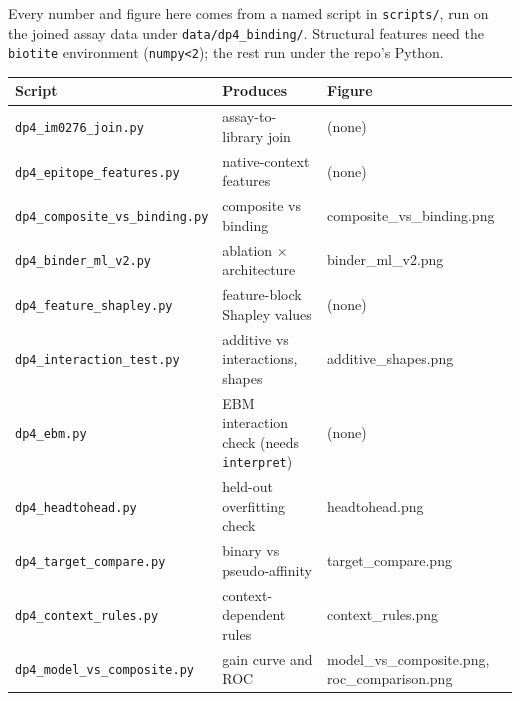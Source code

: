 \documentclass[11pt]{article}
\begin{document}
Every number and figure here comes from a named script in \texttt{scripts/}, run on the joined assay
data under \texttt{data/dp4\_binding/}. Structural features need the \texttt{biotite} environment
(\texttt{numpy<2}); the rest run under the repo's Python.

\footnotesize
\begin{tabular}{@{}lll@{}}
\toprule
Script & Produces & Figure \\
\midrule
\texttt{dp4\_im0276\_join.py} & assay-to-library join & (none) \\
\texttt{dp4\_epitope\_features.py} & native-context features & (none) \\
\texttt{dp4\_composite\_vs\_binding.py} & composite vs binding & composite\_vs\_binding.png \\
\texttt{dp4\_binder\_ml\_v2.py} & ablation $\times$ architecture & binder\_ml\_v2.png \\
\texttt{dp4\_feature\_shapley.py} & feature-block Shapley values & (none) \\
\texttt{dp4\_interaction\_test.py} & additive vs interactions, shapes & additive\_shapes.png \\
\texttt{dp4\_ebm.py} & EBM interaction check (needs \texttt{interpret}) & (none) \\
\texttt{dp4\_headtohead.py} & held-out overfitting check & headtohead.png \\
\texttt{dp4\_target\_compare.py} & binary vs pseudo-affinity & target\_compare.png \\
\texttt{dp4\_context\_rules.py} & context-dependent rules & context\_rules.png \\
\texttt{dp4\_model\_vs\_composite.py} & gain curve and ROC & model\_vs\_composite.png, roc\_comparison.png \\
\bottomrule
\end{tabular}
\end{document}
